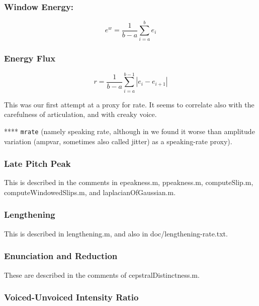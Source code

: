 \documentclass[11pt]{article}
\begin{document}
\bigskip
\subsubsection{Window Energy:}

\begin{equation}
e^w = \frac{1}{b - a} \sum\limits_{i=a}^{b}e_i
\end{equation}

\subsubsection{Energy Flux}
\begin{equation}
r = \frac{1}{b - a} \sum\limits_{i=a}^{b-1}|e_i - e_{i+1}|
\end{equation}

This was our first attempt at a proxy for rate.  It seems to correlate
also with the carefulness of articulation, and with creaky voice.

**** {\tt mrate}
(namely speaking rate, although in \cite{timelm} we found it worse
than amplitude variation (ampvar, sometimes also called jitter) as a
speaking-rate proxy).


\subsubsection{Late Pitch Peak}

This is described in the comments in epeakness.m, ppeakness.m,
computeSlip.m, computeWindowedSlips.m, and laplacianOfGaussian.m. 

\subsubsection{Lengthening}

This is described in lengthening.m, and also in doc/lengthening-rate.txt.

\subsubsection{Enunciation and Reduction}

These are described in the comments of cepstralDistinctness.m.

\subsubsection{Voiced-Unvoiced Intensity Ratio}
\end{document}
